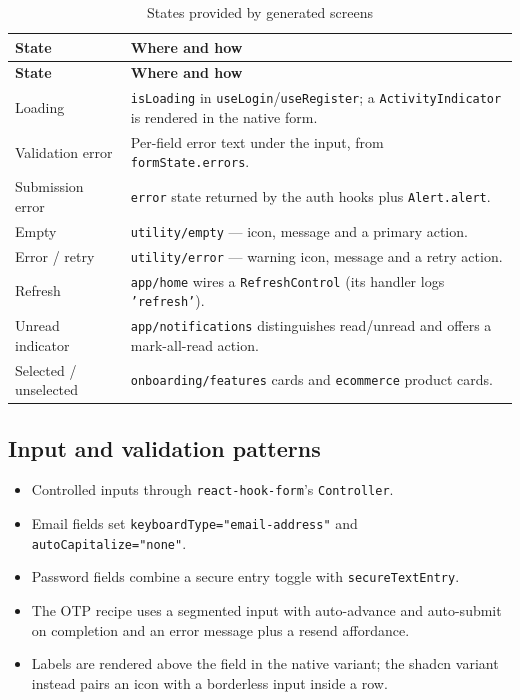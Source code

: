 \begin{longtable}{@{}L{4cm}L{10.2cm}@{}}
\caption{States provided by generated screens}\\
\toprule
\textbf{State} & \textbf{Where and how} \\
\midrule
\endfirsthead
\toprule
\textbf{State} & \textbf{Where and how} \\
\midrule
\endhead
Loading & \texttt{isLoading} in \texttt{useLogin}/\texttt{useRegister}; a
\texttt{ActivityIndicator} is rendered in the native form. \\
Validation error & Per-field error text under the input, from
\texttt{formState.errors}. \\
Submission error & \texttt{error} state returned by the auth hooks plus
\texttt{Alert.alert}. \\
Empty & \texttt{utility/empty} --- icon, message and a primary action. \\
Error / retry & \texttt{utility/error} --- warning icon, message and a retry action. \\
Refresh & \texttt{app/home} wires a \texttt{RefreshControl} (its handler logs
\texttt{'refresh'}). \\
Unread indicator & \texttt{app/notifications} distinguishes read/unread and offers a
mark-all-read action. \\
Selected / unselected & \texttt{onboarding/features} cards and
\texttt{ecommerce} product cards. \\
\bottomrule
\end{longtable}

\subsection*{Input and validation patterns}

\begin{itemize}
  \item Controlled inputs through \texttt{react-hook-form}'s \texttt{Controller}.
  \item Email fields set \texttt{keyboardType="email-address"} and
        \texttt{autoCapitalize="none"}.
  \item Password fields combine a secure entry toggle with
        \texttt{secureTextEntry}.
  \item The OTP recipe uses a segmented input with auto-advance and auto-submit on
        completion and an error message plus a resend affordance.
  \item Labels are rendered above the field in the native variant; the shadcn
        variant instead pairs an icon with a borderless input inside a row.
\end{itemize}

